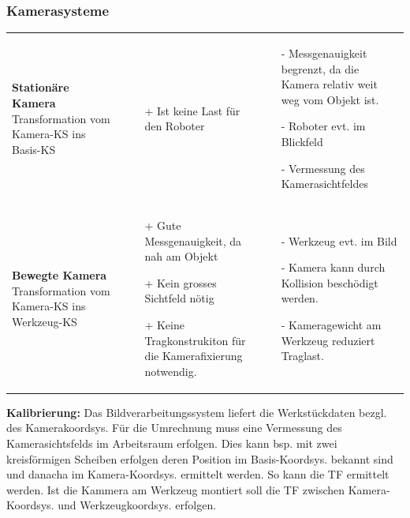  \subsubsection{Kamerasysteme}
 \begin{tabular}{p{5cm}p{6cm}p{6cm}}
    \textbf{Stationäre Kamera}\newline
    Transformation vom Kamera-KS ins Basis-KS&
    \begin{itemize}
        \item[+] Ist keine Last für den Roboter
    \end{itemize}
    &
    \begin{itemize}
        \item[-] Messgenauigkeit begrenzt, da die Kamera relativ weit weg vom Objekt ist.
        \item[-] Roboter evt. im Blickfeld
        \item[-] Vermessung des Kamerasichtfeldes
    \end{itemize}\\
    \textbf{Bewegte Kamera}\newline
    Transformation vom Kamera-KS ins Werkzeug-KS&
    \begin{itemize}
        \item[+] Gute Messgenauigkeit, da nah am Objekt
        \item[+] Kein grosses Sichtfeld nötig
        \item[+] Keine Tragkonstrukiton für die Kamerafixierung notwendig.
    \end{itemize}&
    \begin{itemize}
        \item[-] Werkzeug evt. im Bild
        \item[-] Kamera kann durch Kollision beschödigt werden.
        \item[-] Kameragewicht am Werkzeug reduziert Traglast.
    \end{itemize}\\
 \end{tabular}

        \textbf{Kalibrierung:}\newline
        Das Bildverarbeitungssystem liefert die Werkstückdaten bezgl. des Kamerakoordsys. Für die Umrechnung muss eine Vermessung des Kamerasichtsfelds im Arbeitsraum erfolgen. 
        Dies kann bsp. mit zwei kreisförmigen Scheiben erfolgen deren Position im Basis-Koordsys. bekannt sind und danacha im Kamera-Koordsys. ermittelt werden. So kann die TF ermittelt werden.
        Ist die Kammera am Werkzeug montiert soll die TF zwischen Kamera-Koordsys. und Werkzeugkoordsys. erfolgen.
        \clearpage
        
